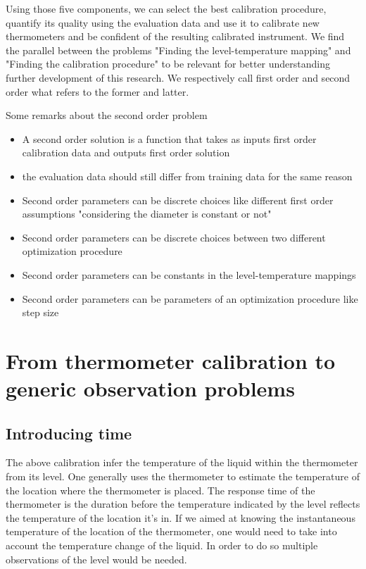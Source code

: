 \begin{bibunit}
Using those five components, we can select the best calibration procedure, quantify its quality using the evaluation data and use it to calibrate new thermometers and be confident of the resulting calibrated instrument.
We find the parallel between the problems "Finding the level-temperature mapping" and  "Finding the calibration procedure" to be relevant for better understanding further development of this research. We respectively call first order and second order what refers to the former and latter. 




Some remarks about the second order problem
\begin{itemize}
\item A second order solution is a function that takes as inputs first order calibration data and outputs first order solution
\item the evaluation data should still differ from training data for the same reason 
\item Second order parameters can be discrete choices like different first order assumptions "considering the diameter is constant or not"
\item Second order parameters can be discrete choices between two different optimization procedure
\item Second order parameters can be constants in the level-temperature mappings
\item Second order parameters can be parameters of an optimization procedure like step size
\end{itemize}

\section{From thermometer calibration to generic observation problems}
\subsection{Introducing time}
The above calibration infer the temperature of the liquid within the thermometer from its level. One generally uses the thermometer to estimate the temperature of the location where the thermometer is placed.
The response time of the thermometer is the duration before the temperature indicated by the level reflects the temperature of the location it's in. 
If we aimed at knowing the instantaneous temperature of the location of the thermometer, one would need to take into account the temperature change of the liquid. In order to do so multiple observations of the level would be needed.


\end{bibunit}
